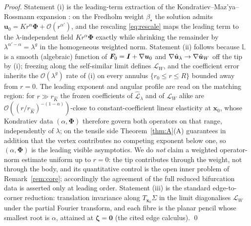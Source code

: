 \begin{proof}
    Statement (i) is the leading-term extraction of the Kondratiev--Maz'ya--Rossmann expansion
    \cite{KMR2001,MazyaRossmann2010}: on the Fredholm weight $\beta_\star$ the solution admits
    $\bm{u}_0=K r^{\alpha}\bm{\Phi}+\mathcal{O}(r^{\alpha'})$, and the rescaling \eqref{eq:rescale} maps the leading term
    to the $\lambda$-independent field $K r^{\alpha}\bm{\Phi}$ exactly while shrinking the remainder by
    $\lambda^{\alpha'-\alpha}=\lambda^{g}$ in the homogeneous weighted norm. Statement (ii) follows because
    $\mathbb{L}$ is a smooth (algebraic) function of $\bm{F}_0=\bm{I}+\nabla\bm{u}_0$ and $\nabla\hat{\bm{u}}_\lambda\to
        \nabla\hat{\bm{u}}_W$ off the tip by (i); freezing along the self-similar limit defines $\mathcal{L}_W$, and the
    coefficient error inherits the $\mathcal{O}(\lambda^{g})$ rate of (i) on every annulus
    $\{r_0\le r\le R\}$ bounded away from $r=0$. The leading exponent and angular profile are read on the matching
    region: for $r\gg r_{\hat K}$ the frozen coefficients of $\widehat{\mathcal{L}}_\lambda$ and of $\mathcal{L}_W$
    alike are $\mathcal{O}((r/r_{\hat K})^{-(1-\alpha)})$-close to constant-coefficient linear elasticity at
    $\bm{x}_0$, whose Kondratiev data $(\alpha,\bm{\Phi})$ therefore govern both operators on that range,
    independently of $\lambda$; on the tensile side Theorem~\ref{thm:A}(A) guarantees in addition that the vertex
    contributes no competing exponent below one, so $(\alpha,\bm{\Phi})$ is the leading visible asymptotics. We do
    \emph{not} claim a weighted operator-norm estimate uniform up to $r=0$:
    the tip contributes through the weight, not through the body, and its quantitative control is the open inner problem
    of Remark~\ref{rem:core}; accordingly the agreement of the full reduced bifurcation data is asserted only at leading
    order. Statement (iii) is the standard edge-to-corner reduction: translation
    invariance along $T_{\bm{x}_0}\Sigma$ in the limit diagonalises $\mathcal{L}_W$ under the partial Fourier transform,
    and each fibre is the planar pencil whose smallest root is $\alpha$, attained at $\bm{\zeta}=\bm0$ (the cited edge
    calculus). \qed
\end{proof}

